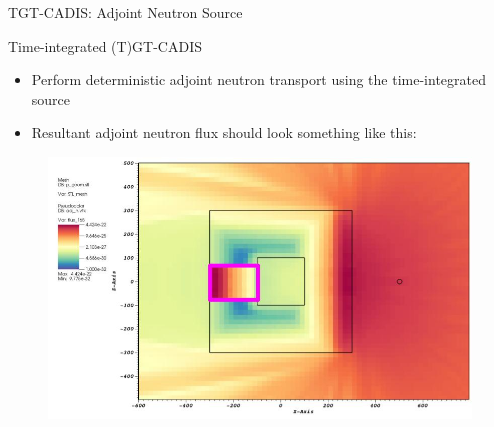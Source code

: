 \documentclass{beamer}
\begin{document}
\begin{frame}{TGT-CADIS: Adjoint Neutron Source}
\end{frame}


\begin{frame}{Time-integrated (T)GT-CADIS}
	\begin{itemize}
		\item{Perform deterministic adjoint neutron transport using the
			time-integrated source}
		\item{Resultant adjoint neutron flux should look something like
			this:}
	\end{itemize}
        \begin{figure}
	\centering
	\includegraphics[scale=0.20]{tgt_adj_n.jpg}
	\end{figure}
\end{frame}
\end{document}

